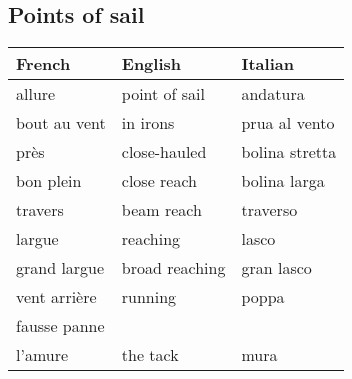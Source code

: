 \documentclass[a4paper, 12pt, twoside]{article}
\begin{document}
    \begin{indt}{\section{Points of sail}} %
        \begin{tabular}{|l|l|l|}
            \hline %
            \textbf{French}
            & \textbf{English}
            & \textbf{Italian}
            \\
            \hline
            \hline %
            allure %
            & point of sail
            & andatura
            \\
            \hline %
            bout au vent %
            & in irons
            & prua al vento
            \\
            \hline %
            près %
            & close-hauled
            & bolina stretta
            \\
            \hline %
            bon plein %
            & close reach
            & bolina larga
            \\
            \hline %
            travers %
            & beam reach
            & traverso
            \\
            \hline %
            largue %
            & reaching
            & lasco
            \\
            \hline %
            grand largue %
            & broad reaching
            & gran lasco
            \\
            \hline %
            vent arrière %
            & running
            & poppa
            \\
            \hline %
            fausse panne %
            &
            &
            \\
            \hline %
            l'amure %
            & the tack
            & mura
            \\
            \hline %
        \end{tabular}
    \end{indt} %
\end{document}
